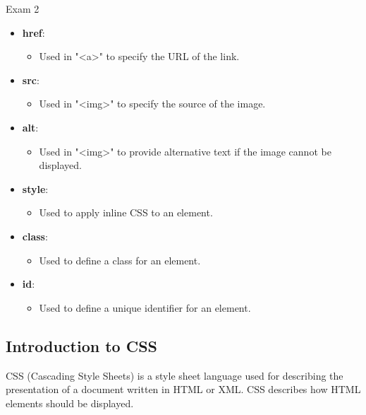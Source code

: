\begin{examnotes}{Exam 2}
\begin{highlight}
        \begin{itemize}
            \item \textbf{href}:
                \begin{itemize}
                    \item Used in "<a>" to specify the URL of the link.
                \end{itemize}
            \item \textbf{src}:
                \begin{itemize}
                    \item Used in "<img>" to specify the source of the image.
                \end{itemize}
            \item \textbf{alt}:
                \begin{itemize}
                    \item Used in "<img>" to provide alternative text if the image cannot be displayed.
                \end{itemize}
            \item \textbf{style}:
                \begin{itemize}
                    \item Used to apply inline CSS to an element.
                \end{itemize}
            \item \textbf{class}:
                \begin{itemize}
                    \item Used to define a class for an element.
                \end{itemize}
            \item \textbf{id}:
                \begin{itemize}
                    \item Used to define a unique identifier for an element.
                \end{itemize}
        \end{itemize}
    \end{highlight}
    
    \subsection*{Introduction to CSS}
    
    CSS (Cascading Style Sheets) is a style sheet language used for describing the presentation of a document written in HTML or XML. CSS describes how HTML elements should be displayed.
    

\end{examnotes}
